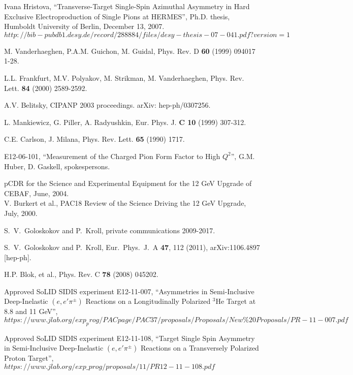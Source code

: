 \begin{thebibliography}{}
 Ivana Hristova, ``Transverse-Target Single-Spin
  Azimuthal Asymmetry in Hard Exclusive Electroproduction of Single Pions at
  HERMES'', Ph.D. thesis, Humboldt University of Berlin, December 13, 2007.\\
$http://bib-pubdb1.desy.de/record/288884/files/desy-thesis-07-041.pdf?version=1$

 M. Vanderhaeghen, P.A.M. Guichon, M. Guidal, Phys. Rev. D 
  {\bf 60} (1999) 094017 1-28.

 L.L. Frankfurt, M.V. Polyakov, M. Strikman, M. Vanderhaeghen,
  Phys. Rev. Lett. {\bf 84} (2000) 2589-2592.

 A.V. Belitsky, CIPANP 2003 proceedings.  arXiv:
  hep-ph/0307256.

 L. Mankiewicz, G. Piller, A. Radyushkin, Eur. Phys. J. {\bf C
    10} (1999) 307-312.

 C.E. Carlson, J. Milana, Phys. Rev. Lett. {\bf 65} (1990) 1717.

 E12-06-101, ``Measurement of the Charged Pion Form Factor to
  High $Q^2$'', G.M. Huber, D. Gaskell, spokespersons.


 pCDR for the Science and Experimental Equipment for the 12 GeV
  Upgrade of CEBAF, June, 2004.\\
V. Burkert et al., PAC18 Review of the Science Driving the 12 GeV Upgrade, 
  July, 2000.

 S.~V.~Goloskokov and P.~Kroll, private communications 2009-2017.

 S.~V.~Goloskokov and P.~Kroll, Eur.\ Phys.\ J.\ A {\bf 47},
  112 (2011), arXiv:1106.4897 [hep-ph].

 H.P. Blok, et al., Phys. Rev. C {\bf 78} (2008) 045202.

  Approved SoLID SIDIS experiment E12-11-007,
``Asymmetries in Semi-Inclusive Deep-Inelastic  $(e,e'\pi^{\pm})$ Reactions on a
Longitudinally Polarized $\mathrm{^{3}He}$ Target at 8.8 and 11 GeV'',\\
$https://www.jlab.org/exp_prog/PACpage/PAC37/proposals/Proposals/New\%20Proposals/PR-11-007.pdf$

  Approved SoLID SIDIS experiment E12-11-108,
``Target Single Spin Asymmetry in Semi-Inclusive Deep-Inelastic
$(e,e'\pi^{\pm})$ Reactions on a Transversely Polarized Proton Target'',\\
$https://www.jlab.org/exp\_prog/proposals/11/PR12-11-108.pdf$


\end{thebibliography}
